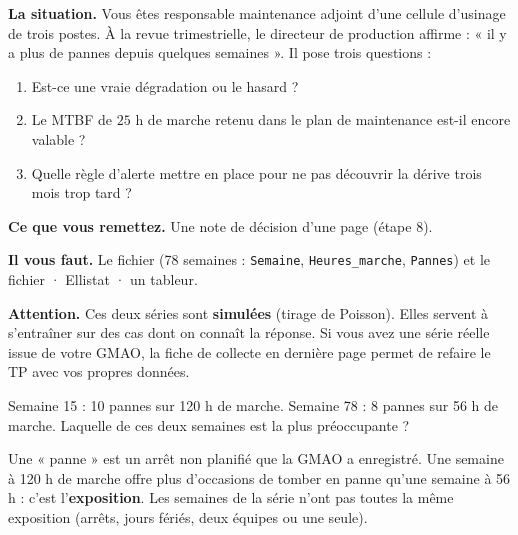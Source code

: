 \documentclass[10pt,a4paper]{article}
\begin{document}
\thispagestyle{fancy}

\begin{tcolorbox}[boite]
\textbf{La situation.} Vous êtes responsable maintenance adjoint d'une cellule d'usinage de trois postes. À la revue trimestrielle, le directeur de production affirme : « il y a plus de pannes depuis quelques semaines ». Il pose trois questions :
\begin{enumerate}[label=\textcolor{cyan}{\textbf{\arabic*.}},leftmargin=15pt]
\item Est-ce une vraie dégradation ou le hasard ?
\item Le MTBF de $25$ h de marche retenu dans le plan de maintenance est-il encore valable ?
\item Quelle règle d'alerte mettre en place pour ne pas découvrir la dérive trois mois trop tard ?
\end{enumerate}
\textbf{Ce que vous remettez.} Une note de décision d'une page (étape 8).\par
\textbf{Il vous faut.} Le fichier  (78 semaines : \texttt{Semaine}, \texttt{Heures\_marche}, \texttt{Pannes}) et le fichier  · Ellistat · un tableur.\par
\textbf{Attention.} Ces deux séries sont \textbf{simulées} (tirage de Poisson). Elles servent à s'entraîner sur des cas dont on connaît la réponse. Si vous avez une série réelle issue de votre GMAO, la fiche de collecte en dernière page permet de refaire le TP avec vos propres données.
\end{tcolorbox}

\begin{tcolorbox}[pred]
Semaine 15 : 10 pannes sur 120 h de marche. Semaine 78 : 8 pannes sur 56 h de marche. Laquelle de ces deux semaines est la plus préoccupante ?\reponse
\end{tcolorbox}


Une « panne » est un arrêt non planifié que la GMAO a enregistré. Une semaine à 120 h de marche offre plus d'occasions de tomber en panne qu'une semaine à 56 h : c'est l'\textbf{exposition}. Les semaines de la série n'ont pas toutes la même exposition (arrêts, jours fériés, deux équipes ou une seule).
\end{document}
